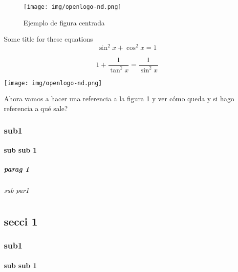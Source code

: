 \documentclass[12pt,a4paper,openany]{book}
\begin{document}
\begin{figure}
	\centering
	\texttt{[image: img/openlogo-nd.png]}
	\caption{Ejemplo de figura centrada}
	\label{fig:logo}
\end{figure}

\begin{tcolorbox}{Some title for these equations}
\[ \sin^2x+\cos^2x=1\]

\[ 1 + \frac{1}{\tan^2x}=\frac{1}{\sin^2x}\]
\end{tcolorbox}

%

\begin{tcolorbox}
	\centering
	\texttt{[image: img/openlogo-nd.png]}
\end{tcolorbox}



Ahora vamos a hacer una referencia a la figura \ref{fig:logo} y ver cómo queda y si hago referencia a \pageref{fig:logo} qué sale?


\Blindtext[1]


\subsection{sub1}
\Blindtext[3]
\subsubsection{sub sub 1}
\Blindtext[3]
\paragraph{parag 1}
\Blindtext[3]
\subparagraph{sub par1}
\Blindtext[3]

	





\chapter{}
\Blindtext[3]
\section{secci 1}
\Blindtext[3]
\subsection{sub1}
\Blindtext[3]
\subsubsection{sub sub 1}
\end{document}
